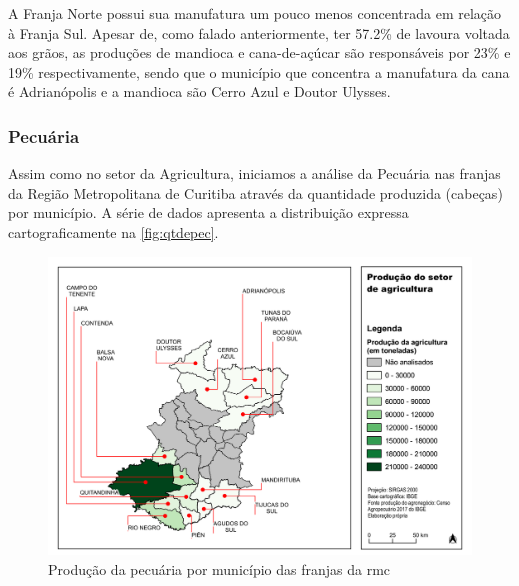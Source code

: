 	A Franja Norte possui sua manufatura um pouco menos concentrada em relação à Franja Sul. Apesar de, como falado anteriormente, ter 57.2\% de lavoura voltada aos grãos, as produções de mandioca e cana-de-açúcar são responsáveis por 23\% e 19\% respectivamente, sendo que o município que concentra a manufatura da cana é Adrianópolis e a mandioca são Cerro Azul e Doutor Ulysses.
	
	\subsubsection{Pecuária}\label{sec:pecuaria}
	
	Assim como no setor da Agricultura, iniciamos a análise da Pecuária nas franjas da Região Metropolitana de Curitiba através da quantidade produzida (cabeças) por município. A série de dados apresenta a distribuição expressa cartograficamente na \autoref{fig:qtdepec}.
	
	\begin{landscape}
		\begin{figure}
			\centering
			\caption{Produção da pecuária por município das franjas da \gls{rmc}}
			\label{fig:qtdepec}
			\includegraphics[width=0.85\linewidth]{../gis/produtos/RMC_censorural_QTDE_PRODUZIDA_AGRO}
		\end{figure}
	\end{landscape}


